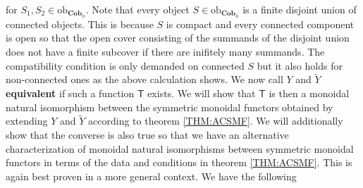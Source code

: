 for $S_{1},S_{2} \in \mathrm{ob}_{\mathbf{Cob}_{n}}$. Note that every object $S \in \mathrm{ob}_{\mathbf{Cob}_{n}}$ is a finite disjoint union of connected objects. This is because $S$ is compact and every connected component is open so that the open cover consisting of the summands of the disjoint union does not have a finite subcover if there are inifitely many summands. The compatibility condition is only demanded on connected $S$ but it also holds for non-connected ones as the above calculation shows. We now call $Y$ and $\tilde{Y}$ \textbf{equivalent} if such a function $\mathsf{T}$ exists. We will show that $\mathsf{T}$ is then a monoidal natural isomorphism between the symmetric monoidal functors obtained by extending $Y$ and $\tilde{Y}$ according to theorem \ref{THM:ACSMF}. We will additionally show that the converse is also true so that we have an alternative characterization of monoidal natural isomorphisms between symmetric monoidal functors in terms of the data and conditions in theorem \ref{THM:ACSMF}. This is again best proven in a more general context. We have the following
\\
